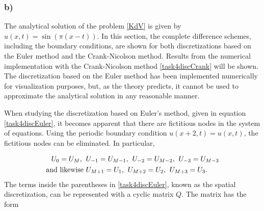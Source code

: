 \subsubsection{b)}\label{ssect:4b}

The analytical solution of the problem \eqref{KdV} is given by $u(x,t) = \sin{(\pi(x-t))}$. In this section, the complete difference schemes, including the boundary conditions, are shown for both discretizations based on the Euler method and the Crank-Nicolson method. Results from the numerical implementation with the Crank-Nicolson method \eqref{task4discCrank} will be shown. The discretization based on the Euler method has been implemented numerically for visualization purposes, but, as the theory predicts, it cannot be used to approximate the analytical solution in any reasonable manner.   

When studying the discretization based on Euler's method, given in equation \eqref{task4discEuler}, it becomes apparent that there are fictitious nodes in the system of equations. Using the periodic boundary condition $u(x+2,t)= u(x,t)$, the fictitious nodes can be eliminated. In particular,

\begin{equation*}
\begin{split}
    U_0 = U_M \text{,} \hspace{2mm} &U_{-1} = U_{M-1} \text{,} \hspace{2mm} U_{-2}= U_{M-2} \text{,} \hspace{2mm} U_{-3}= U_{M-3} \\ \text{and likewise } &U_{M+1} = U_{1} \text{,} \hspace{2mm} U_{M+2}= U_{2} \text{,} \hspace{2mm} U_{M+3}= U_{3}.
\end{split}
\end{equation*}
The terms inside the parentheses in \eqref{task4discEuler}, known as the spatial discretization, can be represented with a cyclic matrix $Q$. The matrix has the form 


